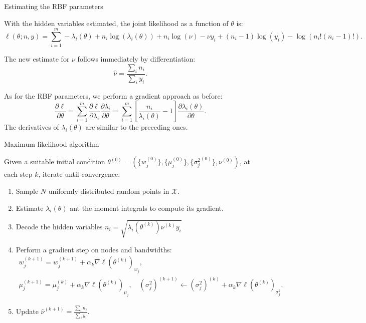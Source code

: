 \documentclass[aspectratio=169]{beamer}
\begin{document}
\begin{frame}{Estimating the RBF parameters}


	With the hidden variables estimated, the joint likelihood as a function of $\theta$ is:
	\begin{equation*}
		\ell(\theta;n,y) = \sum_{i=1}^m -\lambda_i(\theta) + n_i\log(\lambda_i(\theta)) + n_i\log(\nu) - \nu y_i + (n_i-1)\log(y_i) - \log(n_i!(n_i-1)!).
	\end{equation*}
	
	The new estimate for $\nu$ follows immediately by differentiation:
	\begin{equation*}
		\hat{\nu} = \frac{\sum_i n_i}{\sum_i y_i}.
	\end{equation*}
	
	As for the RBF parameters, we perform a gradient approach as before:
	\begin{equation*}
	\frac{\partial \ell}{\partial \theta} = \sum_{i=1}^m \frac{\partial \ell}{\partial \lambda_i}\frac{\partial \lambda_i}{\partial \theta} = \sum_{i=1}^m \left[\frac{n_i}{\lambda_i(\theta)}-1\right]\frac{\partial \lambda_i(\theta)}{\partial \theta}.
	\end{equation*}
	The derivatives of $\lambda_i(\theta)$ are similar to the preceding ones.
\end{frame}

\begin{frame}{Maximum likelihood algorithm}

	Given a suitable initial condition $\theta^{(0)} = (\{w_j^{(0)}\},\{\mu_j^{(0)}\},\{{\sigma_j^2}^{(0)}\},\nu^{(0)})$, at each step $k$, iterate until convergence:

	\vfill 
	\begin{enumerate}
		\item Sample $N$ uniformly distributed random points in $\mathcal{X}$.
		\item Estimate $\lambda_i(\theta)$ ant the moment integrals to compute its gradient.
		\item Decode the hidden variables $n_i = \sqrt{\lambda_i(\theta^{(k)})\nu^{(k)}y_i}$
		\item Perform a gradient step on nodes and bandwidths:
		\begin{gather*}
			w_j^{(k+1)} = w_j^{(k+1)}+ \alpha_k 	\nabla \ell(\theta^{(k)})_{w_j},\\
		\mu_j^{(k+1)} = \mu_j^{(k)} + \alpha_k 	\nabla \ell(\theta^{(k)})_{\mu_j}, \quad (\sigma_j^2)^{(k+1)} \leftarrow (\sigma_j^2)^{(k)} + \alpha_k 	\nabla \ell(\theta^{(k)})_{\sigma_j^2}.
		\end{gather*}
		\item Update $\hat{\nu}^{(k+1)} = \frac{\sum_i n_i}{\sum_i y_i}$.
	\end{enumerate}
\end{frame}
\end{document}
